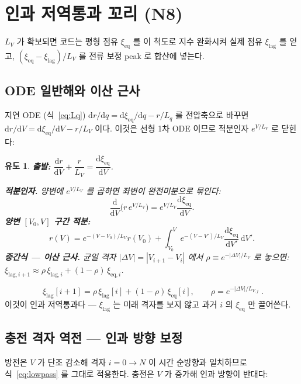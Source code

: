 \documentclass[11pt,a4paper]{article}
\newtheorem*{derivebox}{유도}
\newcommand{\dd}{\mathrm{d}}
\newcommand{\eq}{\mathrm{eq}}
\newcommand{\lag}{\mathrm{lag}}
\begin{document}
\section{인과 저역통과 꼬리 (N8)}\label{sec:tail}
$L_V$ 가 확보되면 코드는 평형 점유 $\xi_\eq$ 를 이 척도로 지수 완화시켜 실제 점유 $\xi_\lag$ 를 얻고,
$(\xi_\eq-\xi_\lag)/L_V$ 를 전류 보정 peak 로 합산에 넣는다.

\subsection{ODE 일반해와 이산 근사}
지연 ODE (식~\eqref{eq:Lq}) $\dd r/\dd q=\dd\xi_\eq/\dd q-r/L_q$ 를 전압축으로 바꾸면
$\dd r/\dd V=\dd\xi_\eq/\dd V-r/L_V$ 이다. 이것은 선형 1차 ODE 이므로 적분인자 $e^{V/L_V}$ 로 닫힌다:

\begin{derivebox}
\textbf{출발: } $\dfrac{\dd r}{\dd V}+\dfrac{r}{L_V}=\dfrac{\dd\xi_\eq}{\dd V}$.

\textbf{적분인자.} 양변에 $e^{V/L_V}$ 를 곱하면 좌변이 완전미분으로 묶인다:
\begin{equation*}
\frac{\dd}{\dd V}\!\big(r\,e^{V/L_V}\big)=e^{V/L_V}\frac{\dd\xi_\eq}{\dd V}.
\end{equation*}
\textbf{양변 $[V_0,V]$ 구간 적분:}
\begin{equation*}
r(V)=e^{-(V-V_0)/L_V}r(V_0)+\int_{V_0}^V e^{-(V-V')/L_V}\frac{\dd\xi_\eq}{\dd V'}\,\dd V'.
\end{equation*}
\textbf{중간식 — 이산 근사.} 균일 격자 $|\Delta V|=|V_{i+1}-V_i|$ 에서 $\rho\equiv e^{-|\Delta V|/L_V}$ 로 놓으면:
$\xi_{\lag,i+1}\approx\rho\,\xi_{\lag,i}+(1-\rho)\,\xi_{\eq,i}$.
\end{derivebox}

\begin{equation}
\boxed{\;\xi_{\lag}[i{+}1]=\rho\,\xi_{\lag}[i]+(1-\rho)\,\xi_{\eq}[i],
\qquad\rho=e^{-|\Delta V|/L_{V,j}}\;.}
\label{eq:lowpass}
\end{equation}
이것이 인과 저역통과다 — $\xi_\lag$ 는 미래 격자를 보지 않고 과거 $i$ 의 $\xi_\eq$ 만 끌어쓴다.

\subsection{충전 격자 역전 — 인과 방향 보정}
방전은 $V$ 가 단조 감소해 격자 $i=0\to N$ 이 시간 순방향과 일치하므로 식~\eqref{eq:lowpass} 를 그대로 적용한다. 충전은 $V$ 가 증가해 인과 방향이 반대다:
\end{document}

